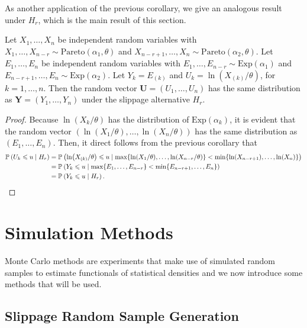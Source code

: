 \documentclass{report}
\begin{document}
As another application of the previous corollary, we give an analogous result under $H_r$, which is the main result of this section.

\begin{cor} \label{cor: distribution of log Pareto OS under Hr}
    Let $X_1,\ldots, X_n$ be independent random variables with $X_1,\ldots,X_{n-r} \sim \mathrm{Pareto}(\alpha_1, \theta)$ and
    $X_{n-r+1},\ldots, X_{n} \sim \mathrm{Pareto}(\alpha_2,\theta)$. Let $E_1,\ldots, E_n$ be independent random variables with $E_1,\ldots,E_{n-r} \sim \mathrm{Exp}(\alpha_1)$ and
    $E_{n-r+1},\ldots, E_{n} \sim \mathrm{Exp}(\alpha_2)$. Let $Y_k = E_{(k)}$ and $U_k = \ln(X_{(k)}/\theta)$, for $k =1,\ldots,n$.
    Then the random vector $\mathbf U =(U_1,\ldots, U_n)$ has the same distribution as $\mathbf Y = (Y_1,\ldots,Y_n)$ under the slippage alternative $H_r$.
\end{cor}

\begin{proof}
    Because $\ln(X_k/\theta)$ has the distribution of $\mathrm{Exp}(\alpha_k)$, it is evident
    that the random vector $(\ln(X_1/\theta),\ldots, \ln(X_n/\theta))$ has the same distribution as $(E_1,\ldots, E_n)$. Then,
    it direct follows from the previous corollary that
    \begin{align*}
        \P{U_k \leqslant u \mid H_r} &= \P{\ln(X_{(k)}/\theta) \leqslant u \mid \max\{ \ln(X_{1}/\theta),\ldots, \ln(X_{n-r}/\theta)\} < \min\{\ln(X_{n-r+1}),\ldots,\ln(X_{n})\}}
        \\
        &= \P{Y_k \leqslant u \mid \max\{E_{1},\ldots,E_{n-r}\} < \min\{E_{n-r+1},\ldots,E_{n}\}}
        \\
        &= \P{Y_k \leqslant u \mid H_r}.
    \end{align*}
\end{proof}

\section{Simulation Methods} \label{sec: simulation methods}

Monte Carlo methods are experiments that make use of simulated random samples to estimate functionals of statistical densities and we now introduce some methods
that will be used.

\subsection{Slippage Random Sample Generation}
\end{document}
